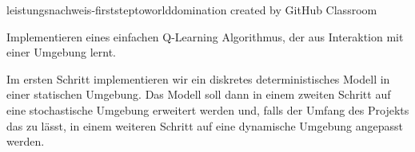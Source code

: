 leistungsnachweis-\/firststeptoworlddomination created by Git\+Hub Classroom

Implementieren eines einfachen Q-\/\+Learning Algorithmus, der aus Interaktion mit einer Umgebung lernt.

Im ersten Schritt implementieren wir ein diskretes deterministisches Modell in einer statischen Umgebung. Das Modell soll dann in einem zweiten Schritt auf eine stochastische Umgebung erweitert werden und, falls der Umfang des Projekts das zu lässt, in einem weiteren Schritt auf eine dynamische Umgebung angepasst werden. 
